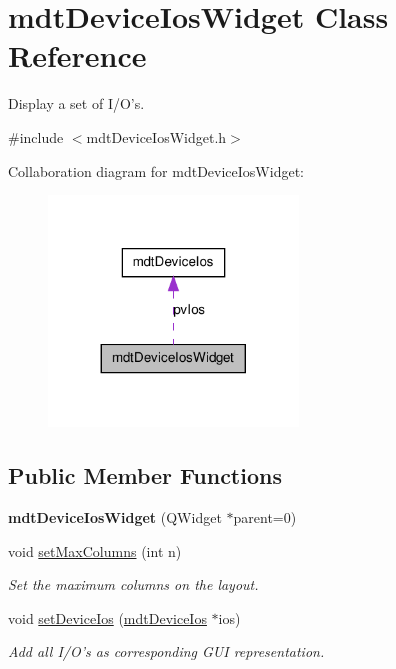 \hypertarget{classmdt_device_ios_widget}{
\section{mdtDeviceIosWidget Class Reference}
\label{classmdt_device_ios_widget}
}


Display a set of I/O's.  




{\ttfamily \#include $<$mdtDeviceIosWidget.h$>$}



Collaboration diagram for mdtDeviceIosWidget:\nopagebreak
\begin{figure}[H]
\begin{center}
\leavevmode
\includegraphics[width=188pt]{classmdt_device_ios_widget__coll__graph}
\end{center}
\end{figure}
\subsection*{Public Member Functions}
\begin{DoxyCompactItemize}
\item 
\hypertarget{classmdt_device_ios_widget_affd43c16896f0191038911231b52a1fd}{
{\bfseries mdtDeviceIosWidget} (QWidget $\ast$parent=0)}
\label{classmdt_device_ios_widget_affd43c16896f0191038911231b52a1fd}

\item 
void \hyperlink{classmdt_device_ios_widget_ad388c95b2bdb48bae976c3fbc2512c30}{setMaxColumns} (int n)
\begin{DoxyCompactList}\small\item\em Set the maximum columns on the layout. \end{DoxyCompactList}\item 
void \hyperlink{classmdt_device_ios_widget_a8fc261333ffc1c3b705ae8609f687159}{setDeviceIos} (\hyperlink{classmdt_device_ios}{mdtDeviceIos} $\ast$ios)
\begin{DoxyCompactList}\small\item\em Add all I/O's as corresponding GUI representation. \end{DoxyCompactList}\end{DoxyCompactItemize}


